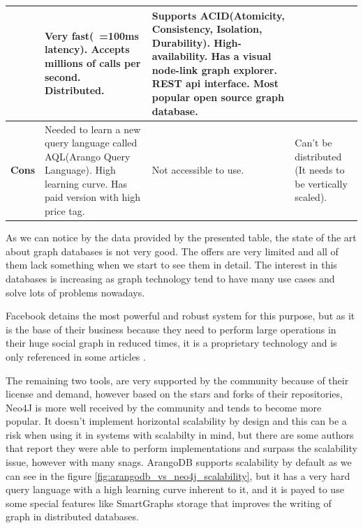 \begin{table}[!b]
\begin{tabularx}{\linewidth} {
        |>{\hsize=0.7\hsize}X|
        >{\hsize=1.1\hsize}X|
        >{\hsize=1.1\hsize}X|
        >{\hsize=1.1\hsize}X| }
         & Very fast(~=100ms latency). Accepts millions of calls per second. Distributed.
         & Supports ACID(Atomicity, Consistency, Isolation, Durability)\cite{acid_definition}. High-availability. Has a visual node-link graph explorer. REST \gls{api} interface. Most popular open source graph database. \\ \hline
        \textbf{Cons}
         & Needed to learn a new query language called AQL(Arango Query Language). High learning curve. Has paid version with high price tag.
         & Not accessible to use.
         & Can’t be distributed (It needs to be vertically scaled).                                                                                                                                                         \\ \hline
    \end{tabularx}
\end{table}

As we can notice by the data provided by the presented table, the state of the art about graph databases is not very good. The offers are very limited and all of them lack something when we start to see them in detail. The interest in this databases is increasing as graph technology tend to have many use cases and solve lots of problems nowadays.

Facebook detains the most powerful and robust system for this purpose, but as it is the base of their business because they need to perform large operations in their huge social graph in reduced times, it is a proprietary technology and is only referenced in some articles \cite{facebook_tao_article}.

The remaining two tools, are very supported by the community because of their license and demand, however based on the stars and forks of their repositories, Neo4J is more well received by the community and tends to become more popular. It doesn't implement horizontal scalability by design and this can be a risk when using it in systems with scalabilty in mind, but there are some authors that report they were able to perform implementations and surpass the scalability issue, however with many snags\cite{neo4j_scalable}. ArangoDB supports scalability by default as we can see in the figure \ref{fig:arangodb_vs_neo4j_scalability}\cite{arangodb_vs_ne4j}, but it has a very hard query language with a high learning curve inherent to it, and it is payed to use some special features like SmartGraphs storage\cite{arangodb_smart_graphs} that improves the writing of graph in distributed databases.


